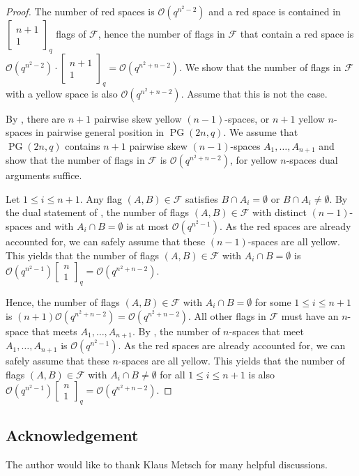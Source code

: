 \documentclass[11pt, oneside, a4paper]{article}
\newcommand{\EKR}{\mathcal{F}}
\newcommand{\OO}{\mathcal{O}}
\newcommand{\Gauss}[2]{{\begin{bmatrix} #1 \\ #2 \end{bmatrix}_q}}
\DeclareMathOperator{\PG}{PG}
\begin{document}
\begin{proof}
 The number of red spaces is $\OO(q^{n^2-2})$ and a red space is contained in $\Gauss{n+1}{1}$ flags of $\EKR$, hence the number of flags in $\EKR$ that contain a red space is $\OO(q^{n^2-2})\cdot \Gauss{n+1}{1}=\OO(q^{n^2+n-2})$. 
   We show that the number of flags in $\EKR$ with a yellow space is also $\OO(q^{n^2+n-2})$. Assume that this is not the case.

     By , there are $n+1$ pairwise skew yellow $(n-1)$-spaces, or $n+1$ yellow $n$-spaces in pairwise general position in $\PG(2n,q)$. We assume that $\PG(2n,q)$ contains $n+1$ pairwise skew $(n-1)$-spaces $A_1,\ldots,A_{n+1}$ and show that the number of flags in $\EKR$ is $\OO(q^{n^2+n-2})$, for yellow $n$-spaces dual arguments suffice.
     
     Let $1\leq i\leq n+1$. 
     Any flag $(A,B)\in \EKR$ satisfies $B\cap A_i=\emptyset$ or $B\cap A_i\neq\emptyset$.
     By the dual statement of , the number of flags $(A,B)\in \EKR$ with distinct $(n-1)$-spaces and with $A_i\cap B=\emptyset$ is at most $\OO(q^{n^2-1})$. As the red spaces are already accounted for, we can safely assume that these $(n-1)$-spaces are all yellow. This yields that the number of flags $(A,B)\in \EKR$ with $A_i\cap B=\emptyset$ is $\OO(q^{n^2-1})\Gauss{n}{1}=\OO(q^{n^2+n-2})$. 
     
     Hence, the number of flags $(A,B)\in \EKR$ with $A_i\cap B=\emptyset$ for some $1\leq i\leq n+1$ is $(n+1)\OO(q^{n^2+n-2})=\OO(q^{n^2+n-2})$. All other flags in $\EKR$ must have an $n$-space that meets $A_1,\ldots,A_{n+1}$. By , the number of $n$-spaces that meet $A_1,\ldots,A_{n+1}$ is $\OO(q^{n^2-1})$. As the red spaces are already accounted for, we can safely assume that these $n$-spaces are all yellow. This yields that the number of flags $(A,B)\in \EKR$ with $A_i\cap B\neq\emptyset$ for all $1\leq i\leq n+1$  is also $\OO(q^{n^2-1})\Gauss{n}{1}=\OO(q^{n^2+n-2})$. 
\end{proof}



\subsection*{Acknowledgement}

The author would like to thank Klaus Metsch for many helpful discussions.




\end{document}
